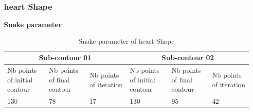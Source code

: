 \subsubsection{heart Shape}

\textbf{Snake parameter}

\begin{table}[H]
    \begin{tabular}{ |p{2cm}|p{2cm}|p{2cm}|p{2cm}|p{2cm}|p{2cm}| }
        \hline
        \multicolumn{3}{|c|}{Sub-contour 01} & \multicolumn{3}{|c|}{Sub-contour 02} \\
        \hline
        Nb points of initial contour &
        Nb points of final contour &
        Nb points of iteration &
        Nb points of initial contour &
        Nb points of final contour &
        Nb points of iteration
        \\
        \hline
        130   &  78    &  17  & 130  & 95  & 42 \\

        \hline

    \end{tabular}
    \caption{Snake parameter of heart Shape}
    \label{tab:table02}
\end{table}


